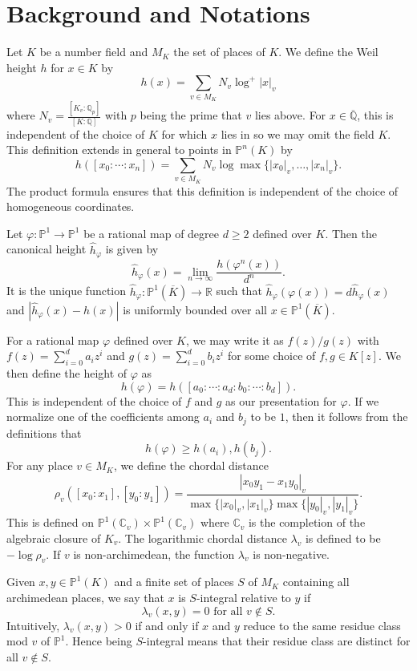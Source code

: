 \documentclass[10pt, reqno]{amsart}
\newcommand{\bb}{\mathbb}
\newcommand{\vphi}{\varphi}
\newcommand{\ovl}{\overline}
\newcommand{\h}{\widehat{h}}
\numberwithin{theorem}{section}
\numberwithin{equation}{section}
\numberwithin{example}{section}
\numberwithin{definition}{section}
\begin{document}
\section{Background and Notations} \label{sec:Definition}
Let $K$ be a number field and $M_K$ the set of places of $K$. We define the Weil height $h$ for $x \in K$ by 
$$h(x) = \sum_{v \in M_K} N_v \log^+|x|_v$$
where $N_v = \frac{[K_v:\bb{Q}_p]}{[K:\bb{Q}]}$ with $p$ being the prime that $v$ lies above. For $x \in \ovl{\bb{Q}}$, this is independent of the choice of $K$ for which $x$ lies in so we may omit the field $K$. This definition extends in general to points in $\bb{P}^n(K)$ by
$$h([x_0:\cdots:x_n]) = \sum_{v \in M_K} N_v \log \max\{|x_0|_v,\ldots,|x_n|_v\}.$$
The product formula ensures that this definition is independent of the choice of homogeneous coordinates.
\par 
Let $\vphi: \bb{P}^1 \to \bb{P}^1$ be a rational map of degree $d \geq 2$ defined over $K$. Then the canonical height $\h_{\vphi}$ is given by
$$\h_{\vphi}(x) = \lim_{n \to \infty} \frac{h(\vphi^n(x))}{d^n}.$$
It is the unique function $\h_{\vphi}: \bb{P}^1(\ovl{K}) \to \bb{R}$ such that $\h_{\vphi}(\vphi(x)) = d \h_{\vphi}(x)$ and $|\h_{\vphi}(x) - h(x)|$ is uniformly bounded over all $x \in \bb{P}^1(\ovl{K})$. 
\par 
For a rational map $\vphi$ defined over $K$, we may write it as $f(z)/g(z)$ with $f(z) = \sum_{i=0}^{d} a_i z^i$ and $g(z) = \sum_{i=0}^{d} b_i z^i$ for some choice of $f,g \in K[z]$. We then define the height of $\vphi$ as
$$h(\vphi) = h([a_0:\cdots:a_d:b_0:\cdots:b_d]).$$
This is independent of the choice of $f$ and $g$ as our presentation for $\vphi$. If we normalize one of the coefficients among $a_i$ and $b_j$ to be $1$, then it follows from the definitions that 
$$h(\vphi) \geq h(a_i),h(b_j).$$
For any place $v \in M_K$, we define the chordal distance \cite[Chapter 5.1]{Ben19}
$$\rho_v([x_0:x_1],[y_0:y_1]) = \frac{|x_0y_1 - x_1y_0|_v}{\max\{|x_0|_v,|x_1|_v\} \max\{|y_0|_v,|y_1|_v\}}.$$
This is defined on $\bb{P}^1(\bb{C}_v) \times \bb{P}^1(\bb{C}_v)$ where $\bb{C}_v$ is the completion of the algebraic closure of $K_v$. The logarithmic chordal distance $\lambda_v$ is defined to be $-\log \rho_v$. If $v$ is non-archimedean, the function $\lambda_v$ is non-negative. 
\par 
Given $x,y \in \bb{P}^1(K)$ and a finite set of places $S$ of $M_K$ containing all archimedean places, we say that $x$ is $S$-integral relative to $y$ if 
$$\lambda_v(x,y) = 0 \text{ for all } v \not \in S.$$
Intuitively, $\lambda_v(x,y) > 0$ if and only if $x$ and $y$ reduce to the same residue class mod $v$ of $\bb{P}^1$. Hence being $S$-integral means that their residue class are distinct for all $v \not \in S$. 
\end{document}
